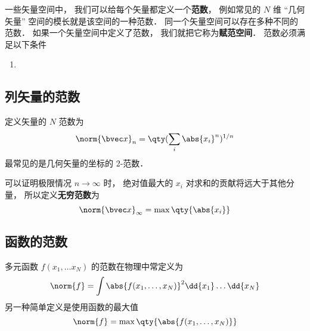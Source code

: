 

一些矢量空间中， 我们可以给每个矢量都定义一个\textbf{范数}， 例如常见的 $N$ 维 “几何矢量” 空间的模长就是该空间的一种范数． 同一个矢量空间可以存在多种不同的范数． 如果一个矢量空间中定义了范数， 我们就把它称为\textbf{赋范空间}． 范数必须满足以下条件

\begin{enumerate}
\item 
\end{enumerate}

\subsection{列矢量的范数}
定义矢量的 $N$ 范数为
\begin{equation}
\norm{\bvec x}_n = \qty(\sum_i \abs{x_i}^n)^{1/n}
\end{equation}
最常见的是几何矢量的坐标的 2-范数．


可以证明极限情况 $n \to \infty$ 时， 绝对值最大的 $x_i$ 对求和的贡献将远大于其他分量， 所以定义\textbf{无穷范数}为
\begin{equation}
\norm{\bvec x}_\infty = \max \qty{\abs{x_i}}
\end{equation}

\subsection{函数的范数}
多元函数 $f(x_1, \dots x_N)$ 的范数在物理中常定义为
\begin{equation}
\norm{f} = \int \abs{f(x_1, \dots, x_N)}^2 \dd{x_1}\dots \dd{x_N}
\end{equation}
另一种简单定义是使用函数的最大值
\begin{equation}
\norm{f} = \max\qty{\abs{f(x_1, \dots, x_N)}}
\end{equation}
